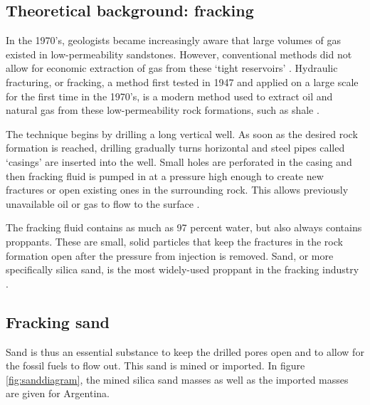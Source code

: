\subsection{Theoretical background: fracking}
In the 1970's, geologists became increasingly aware that large volumes of gas existed in low-permeability sandstones. However, conventional methods did not allow for economic extraction of gas from these `tight reservoirs' \autocite{lawGasTightReservoirs1992}. Hydraulic fracturing, or fracking, a method first tested in 1947 and applied on a large scale for the first time in the 1970's, is a modern method used to extract oil and natural gas from these low-permeability rock formations, such as shale \autocite{denchakFracking1012019}.

The technique begins by drilling a long vertical well. As soon as the desired rock formation is reached, drilling gradually turns horizontal and steel pipes called `casings' are inserted into the well. Small holes are perforated in the casing and then fracking fluid is pumped in at a pressure high enough to create new fractures or open existing ones in the surrounding rock. This allows previously unavailable oil or gas to flow to the surface \autocite{denchakFracking1012019}.

The fracking fluid contains as much as 97 percent water, but also always contains proppants. These are small, solid particles that keep the fractures in the rock formation open after the pressure from injection is removed. Sand, or more specifically silica sand, is the most widely-used proppant in the fracking industry \autocite{denchakFracking1012019}. 

\subsection{Fracking sand}
Sand is thus an essential substance to keep the drilled pores open and to allow for the fossil fuels to flow out. This sand is mined or imported. In figure \ref{fig:sanddiagram}, the mined silica sand masses as well as the imported masses are given for Argentina.

